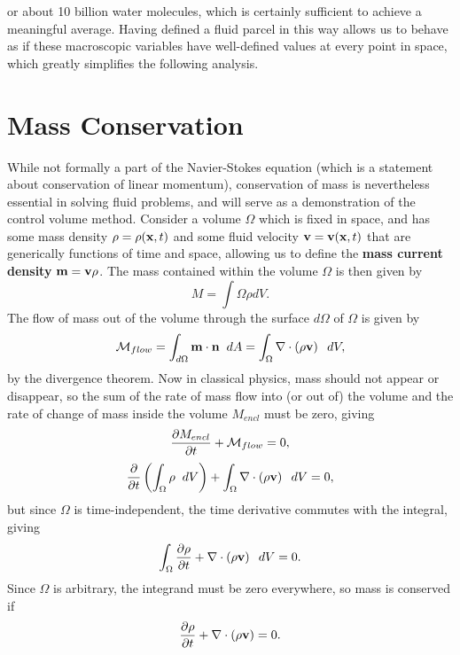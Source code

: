 or about 10 billion water molecules, which is certainly sufficient to achieve a meaningful average. Having defined a fluid parcel in this way allows us to behave as if these macroscopic variables have well-defined values at every point in space, which greatly simplifies the following analysis. 

\section{Mass Conservation}
While not formally a part of the Navier-Stokes equation (which is a statement about conservation of linear momentum), conservation of mass is nevertheless essential in solving fluid problems, and will serve as a demonstration of the control volume method. Consider a volume $\Omega$ which is fixed in space, and has some mass density $\rho = \rho(\mathbf{x},t)$ and some fluid velocity $\mathbf{v} = \mathbf{v}(\mathbf{x} ,t)$ that are generically functions of time and space, allowing us to define the {\bf mass current density} $\mathbf{m} = \mathbf{v}\rho$. The mass contained within the volume $\Omega$ is then given by 
\begin{equation}
M = \int{\Omega}{}{\rho}{dV}.
\end{equation}
The flow of mass out of the volume through the surface $d\Omega$ of $\Omega$ is given by 
\begin{equation}
\mathcal{M}_{flow} = \int{d\Omega}{}{\Vector{m}\cdot\Vector{n}}{dA} = \int{\Omega}{}{\Div{\paren{\rho\Vector{v}}}}{dV},
\end{equation}
by the divergence theorem.  Now in classical physics, mass should not appear or disappear, so the sum of the rate of mass flow into (or out of) the volume and the rate of change of mass inside the volume $M_{encl}$ must be zero, giving
\begin{equation}
\pder{1}{M_{encl}}{t} + \mathcal{M}_{flow} = 0,
\end{equation}
\begin{equation}
\pder{1}{}{t}\paren{\int{\Omega}{}{\rho}{dV}} + \int{\Omega}{}{\Div{\paren{\rho\Vector{v}}}}{dV} =0,
\end{equation}
but since $\Omega$ is time-independent, the time derivative commutes with the integral, giving 
\begin{equation}
\int{\Omega}{}{\pder{1}{\rho}{t} + \Div{\paren{\rho\Vector{v}}}}{dV} = 0.
\end{equation}
Since $\Omega$ is arbitrary, the integrand must be zero everywhere, so mass is conserved if
\begin{equation}\label{eq:consMassFull}
\pder{1}{\rho}{t} + \Div{\paren{\rho\Vector{v}} }= 0.
\end{equation}

